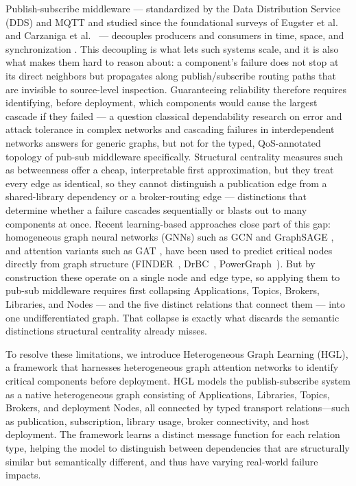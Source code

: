 \documentclass[review]{elsarticle}
\begin{document}
Publish-subscribe middleware --- standardized by the Data Distribution Service (DDS) and MQTT and
studied since the foundational surveys of Eugster et al.~\cite{Eugster2003} and Carzaniga et
al.~\cite{Carzaniga2001} --- decouples producers and consumers in time, space, and synchronization
\cite{OMG2015DDS,OASIS2019MQTT}. This decoupling is what lets such systems scale, and it is also
what makes them hard to reason about: a component's failure does not stop at its direct neighbors
but propagates along publish/subscribe routing paths that are invisible to source-level inspection.
Guaranteeing reliability therefore requires identifying, before deployment, which components would
cause the largest cascade if they failed --- a question classical dependability research on error
and attack tolerance in complex networks \cite{Albert2000} and cascading failures in interdependent
networks \cite{Buldyrev2010} answers for generic graphs, but not for the typed, QoS-annotated
topology of pub-sub middleware specifically. Structural centrality measures such as betweenness
\cite{Freeman1977,Brandes2001} offer a cheap, interpretable first approximation, but they treat
every edge as identical, so they cannot distinguish a publication edge from a shared-library
dependency or a broker-routing edge --- distinctions that determine whether a failure cascades
sequentially or blasts out to many components at once. Recent learning-based approaches close part
of this gap: homogeneous graph neural networks (GNNs) such as GCN \cite{Kipf2017} and GraphSAGE
\cite{Hamilton2017}, and attention variants such as GAT \cite{Velickovic2018}, have been used to
predict critical nodes directly from graph structure (FINDER~\cite{Fan2020}, DrBC~\cite{Munikoti2022},
PowerGraph~\cite{Munikoti2024}). But by construction these operate on a single node and edge type,
so applying them to pub-sub middleware requires first collapsing Applications, Topics, Brokers,
Libraries, and Nodes --- and the five distinct relations that connect them --- into one
undifferentiated graph. That collapse is exactly what discards the semantic distinctions structural
centrality already misses.

To resolve these limitations, we introduce Heterogeneous Graph Learning (HGL), a framework that
harnesses heterogeneous graph attention networks
\cite{Schlichtkrull2018,Wang2019,Hu2020,Fu2020} to identify critical components before deployment.
HGL models the publish-subscribe system as a native heterogeneous graph consisting of Applications,
Libraries, Topics, Brokers, and deployment Nodes, all connected by typed transport relations---such
as publication, subscription, library usage, broker connectivity, and host deployment. The
framework learns a distinct message function for each relation type, helping the model to
distinguish between dependencies that are structurally similar but semantically different, and thus
have varying real-world failure impacts.
\end{document}
